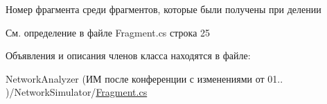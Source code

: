 Номер фрагмента среди фрагментов, которые были получены при делении 



См. определение в файле Fragment.\+cs строка 25



Объявления и описания членов класса находятся в файле\+:\begin{DoxyCompactItemize}
\item 
Network\+Analyzer (ИМ после конференции  с изменениями от 01.. )/\+Network\+Simulator/\hyperlink{_fragment_8cs}{Fragment.\+cs}\end{DoxyCompactItemize}
